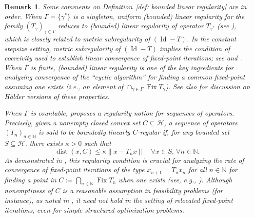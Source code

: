 \documentclass[a4paper,12pt]{article}
\newtheorem{remark}[theorem]{Remark}
\DeclareMathOperator{\Id}{Id}
\DeclareMathOperator{\Fix}{Fix}
\DeclareMathOperator{\dist}{dist}
\begin{document}
\begin{remark}
Some comments on Definition~\ref{def: bounded linear regularity} are in order. When $\Gamma=\{\gamma^*\}$ is a singleton, uniform (bounded) linear regularity for the family $(T_\gamma)_{\gamma\in\Gamma}$ reduces to \emph{(bounded) linear regularity} of operator $T_{\gamma^*}$ (see \cite[Definition~2.1]{bauschke2015linear}), which is closely related to \emph{metric subregularity} of $(\Id-T)$. In the constant stepsize setting, metric subregularity of $(\Id-T)$ implies the condition of coercivity used to establish linear convergence of fixed-point iterations; see \cite[eq. (3.1), Lemma~3.1]{hesse2013nonconvex} and \cite[Theorem~1.6]{aspelmeier2016local}. When $\Gamma$ is finite, (bounded) linear regularity is one of the key ingredients for analyzing convergence of the ``cyclic algorithm'' for finding a common fixed-point assuming one exists \cite[Corollary~6.2]{bauschke2015linear} (\emph{i.e.,} an element of $\cap_{\gamma\in\Gamma}\Fix T_{\gamma}$). See also \cite{borwein2017convergence} for discussion on H\"older versions of these properties. 

When $\Gamma$ is countable, \cite[Definition 4.1]{cegielski2018regular} proposes a regularity notion for sequences of operators. Precisely, given a nonempty closed convex set $C \subseteq \mathcal{H}$, a sequence of operators $(T_n)_{n\in\mathbb{N}}$ is said to be \emph{boundedly linearly $C$-regular} if, for any bounded set $S \subseteq \mathcal{H}$, there exists $\kappa >0$ such that 
$$\dist(x, C)\leq \kappa \|x - T_n x\|\quad\forall x \in S,\,\forall n \in \mathbb{N}.$$
As  demonstrated in \cite{cegielski2018regular}, this regularity condition is crucial for analyzing the rate of convergence of fixed-point iterations of the type $x_{n+1} = T_n x_n$ for all $n \in \mathbb{N}$ for finding a point in $C:=\bigcap_{n \in \mathbb{N}} \Fix T_n$ when one exists (see, e.g., \cite[Theorem 6.1]{cegielski2018regular}). Although nonemptiness of $C$ is a reasonable assumption in feasibility problems (for instance),  as noted in \cite[Remark 4.13]{atenas2025relocated}, it need not hold in the setting of relocated fixed-point iterations, even for simple structured optimization problems.
\end{remark}
\end{document}
